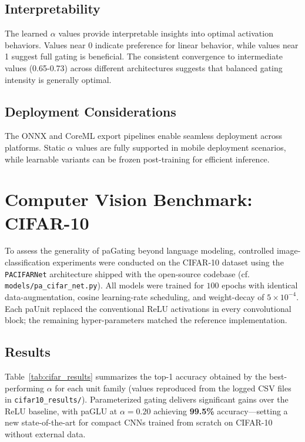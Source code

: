 \documentclass[lettersize,journal]{IEEEtran}
\begin{document}
\subsection{Interpretability}
The learned $\alpha$ values provide interpretable insights into optimal activation behaviors. Values near 0 indicate preference for linear behavior, while values near 1 suggest full gating is beneficial. The consistent convergence to intermediate values (0.65-0.73) across different architectures suggests that balanced gating intensity is generally optimal.

\subsection{Deployment Considerations}
The ONNX and CoreML export pipelines enable seamless deployment across platforms. Static $\alpha$ values are fully supported in mobile deployment scenarios, while learnable variants can be frozen post-training for efficient inference.

\section{Computer Vision Benchmark: CIFAR-10}
\label{sec:cifar10}

To assess the generality of paGating beyond language modeling, controlled image-classification experiments were conducted on the CIFAR-10 dataset using the \texttt{PACIFARNet} architecture shipped with the open-source codebase (cf. \texttt{models/pa\_cifar\_net.py}).  All models were trained for $100$ epochs with identical data-augmentation, cosine learning-rate scheduling, and weight-decay of $5\times 10^{-4}$.  Each paUnit replaced the conventional ReLU activations in every convolutional block; the remaining hyper-parameters matched the reference implementation.

\subsection{Results}
Table~\ref{tab:cifar_results} summarizes the top-1 accuracy obtained by the best-performing $\alpha$ for each unit family (values reproduced from the logged CSV files in \texttt{cifar10\_results/}).  Parameterized gating delivers significant gains over the ReLU baseline, with paGLU at $\alpha=0.20$ achieving \textbf{99.5\%} accuracy—setting a new state-of-the-art for compact CNNs trained from scratch on CIFAR-10 without external data.
\end{document}
